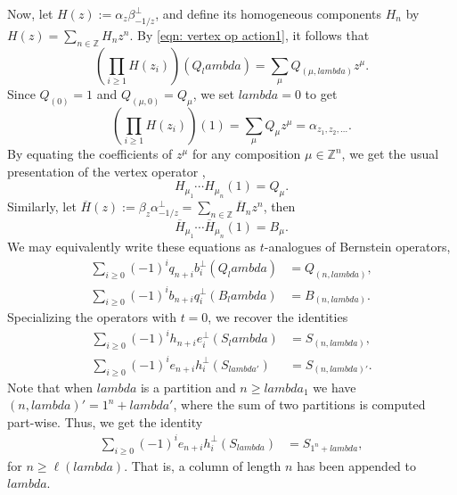 \documentclass[12pt]{amsart}%
\def\lambda{lambda}%
\theoremstyle{remark}
\theoremstyle{definition}
\newcommand{\Z}{\mathbb{Z}}
\begin{document}

    Now, let $H(z):=\alpha_z\beta_{-1/z}^\perp$, and define its homogeneous components $H_n$ by $H(z)=\sum_{n\in\Z}H_nz^n$. By \eqref{eqn: vertex op action1}, it follows that
    \[\left(\prod_{i\geq1}H(z_i)\right)(Q_\lambda)=\sum_{\mu}Q_{(\mu,\lambda)}z^\mu.\]
    Since $Q_{(0)}=1$ and $Q_{(\mu,0)}=Q_\mu$, we set $\lambda=0$ to get
    \[\left(\prod_{i\geq1}H(z_i)\right)(1)=\sum_{\mu}Q_{\mu}z^\mu=\alpha_{z_1,z_2,\ldots}.\]
    By equating the coefficients of $z^\mu$ for any composition $\mu\in\Z^n$, we get the usual presentation of the vertex operator \cite{jing:1991b},
    \[H_{\mu_1}\cdots H_{\mu_n}(1)=Q_\mu.\]
    Similarly, let $\overline{H}(z):=\beta_z\alpha_{-1/z}^\perp=\sum_{n\in\Z}\overline{H}_nz^n$, then
    \[\overline{H}_{\mu_1}\cdots \overline{H}_{\mu_n}(1)=B_\mu.\]
    We may equivalently write these equations as $t$-analogues of Bernstein operators,
    \begin{align*}
        \sum_{i\geq0}(-1)^iq_{n+i}b_i^\perp(Q_\lambda)&=Q_{(n,\lambda)},\\
        \sum_{i\geq0}(-1)^ib_{n+i}q_i^\perp(B_\lambda)&=B_{(n,\lambda)}.
    \end{align*}
    Specializing the operators with $t=0$, we recover the identities
    \begin{align*}
        \sum_{i\geq0}(-1)^ih_{n+i}e_i^\perp(S_\lambda)&=S_{(n,\lambda)},\\
        \sum_{i\geq0}(-1)^ie_{n+i}h_i^\perp(S_{\lambda'})&=S_{(n,\lambda)'}.
    \end{align*}
    Note that when $\lambda$ is a partition and $n\geq\lambda_1$ we have $(n,\lambda)'=1^n+\lambda'$, where the sum of two partitions is computed part-wise. Thus, we get the identity
    \begin{align*}
        \sum_{i\geq0}(-1)^ie_{n+i}h_i^\perp(S_{\lambda})&=S_{1^n+\lambda},
    \end{align*}
    for $n\geq\ell(\lambda)$. That is, a column of length $n$ has been appended to $\lambda$.
    
\end{document}

